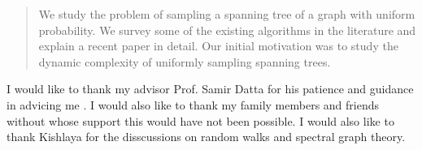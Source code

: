 \documentclass[
11pt, %
english, %
singlespacing, %
liststotoc, %
toctotoc, %
headsepline, %
chapterinoneline, %
]{MastersDoctoralThesis} %
\begin{document}
\begin{abstract}
  \addchaptertocentry{\abstractname} %
  We study the problem of sampling a spanning tree of a graph with uniform probability. We survey some of the existing algorithms in the literature and explain a recent paper \citet{harvey2016generating} in detail.  Our initial motivation was to study the dynamic complexity of uniformly sampling spanning trees.
\end{abstract}


\begin{acknowledgements}
  \addchaptertocentry{\acknowledgementname} %
  I would like to thank my advisor Prof. Samir Datta for his patience and guidance in advicing me . I would also like to thank my family members and friends without whose support this would have not been possible. I would also like to thank Kishlaya for the disscussions on random walks and spectral graph theory. 
\end{acknowledgements}


\tableofcontents %

\listoffigures %


% 
%   
%   

% 
%   
%   
%   
\end{document}
